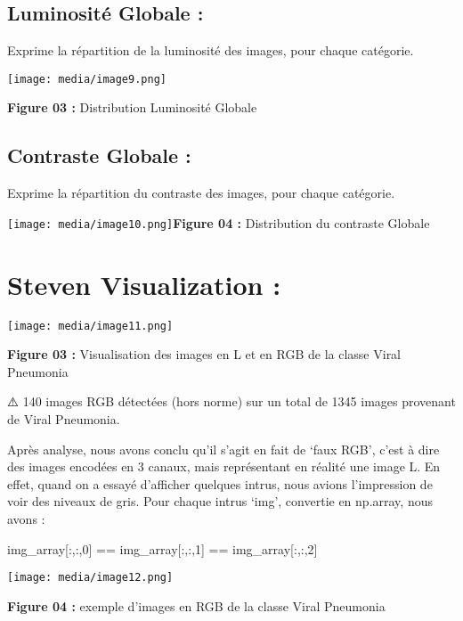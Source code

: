 \subsection{\texorpdfstring{Luminosité Globale :
}{Luminosité Globale : }}\label{luminosituxe9-globale}

Exprime la répartition de la luminosité des images, pour chaque
catégorie.

\texttt{[image: media/image9.png]}

\textbf{Figure 03 :} Distribution Luminosité Globale

\subsection{Contraste Globale :}\label{contraste-globale}

Exprime la répartition du contraste des images, pour chaque catégorie.

\texttt{[image: media/image10.png]}\textbf{Figure
04 :} Distribution du contraste Globale

\section[Steven Visualization
:]{\texorpdfstring{\protect\hypertarget{anchor-13}{}{}\protect\hypertarget{anchor-14}{}{}\protect\hypertarget{anchor-15}{}{}Steven
Visualization :}{Steven Visualization :}}\label{steven-visualization}

\texttt{[image: media/image11.png]}

\textbf{Figure 03 :} Visualisation des images en L et en RGB de la
classe Viral Pneumonia

⚠️ 140 images RGB détectées (hors norme) sur un total de 1345 images
provenant de Viral Pneumonia.

Après analyse, nous avons conclu qu'il s'agit en fait de `faux RGB',
c'est à dire des images encodées en 3 canaux, mais représentant en
réalité une image L. En effet, quand on a essayé d'afficher quelques
intrus, nous avions l'impression de voir des niveaux de gris. Pour
chaque intrus `img', convertie en np.array, nous avons :

img\_array{[}:,:,0{]} == img\_array{[}:,:,1{]} == img\_array{[}:,:,2{]}

\texttt{[image: media/image12.png]}

\textbf{Figure 04 :} exemple d'images en RGB de la classe Viral
Pneumonia

